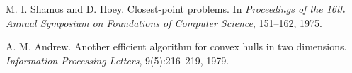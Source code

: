 \begin{thebibliography}{9}
    M. I. Shamos and D. Hoey.
    Closest-point problems.
    In \emph{Proceedings of the 16th Annual Symposium on Foundations of Computer Science}, 151--162, 1975.
  
  
  
    A. M. Andrew.
    Another efficient algorithm for convex hulls in two dimensions.
    \emph{Information Processing Letters}, 9(5):216--219, 1979.
  
  
  
  
  
  
  
  
  
  
  
  
  
  
  
  
  
  
  
  
  
  
  
  
  
  \end{thebibliography}
  
